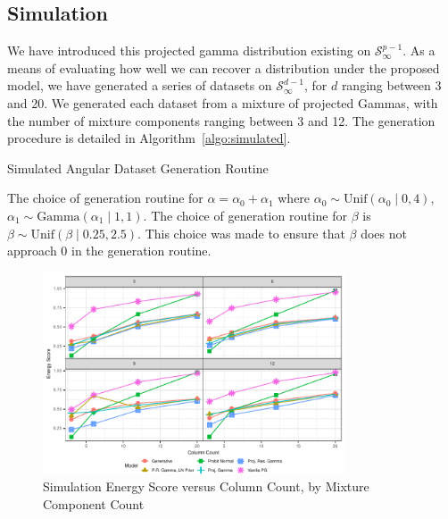 \subsection{Simulation}
We have introduced this projected gamma distribution existing on $\mathcal{S}_{\infty}^{p-1}$.  As a
  means of evaluating how well we can recover a distribution under the proposed model, we have
  generated a series of datasets on $\mathcal{S}_{\infty}^{d-1}$, for $d$ ranging between 3 and 20.
  We generated each dataset from a mixture of projected Gammas, with the number of mixture components
  ranging between 3 and 12.  The generation procedure is detailed in Algorithm~\ref{algo:simulated}.
  \begin{algorithm}[H]
    \label{algo:simulated}
    \caption{Simulated Angular Dataset Generation Routine}
  \end{algorithm}
  The choice of generation routine for $\alpha = \alpha_0 + \alpha_1$ where
  $\alpha_0 \sim \text{Unif}(\alpha_0\mid 0,4)$, $\alpha_1\sim \text{Gamma}(\alpha_1\mid 1,1)$.
  The choice of generation routine for $\beta$ is $\beta\sim\text{Unif}(\beta\mid 0.25, 2.5)$.
  This choice was made to ensure that $\beta$ does not approach 0 in the generation routine.

\begin{figure}[h]
  \label{fig:simes}
  \caption{Simulation Energy Score versus Column Count, by Mixture Component Count}
  \centering
  \includegraphics[width=0.8\textwidth]{./images/simulation_es}
\end{figure}

